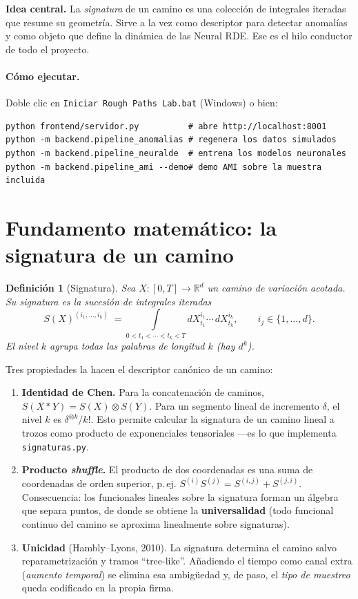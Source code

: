 \documentclass[11pt,a4paper]{article}
\newtheorem{definicion}{Definición}
\begin{document}
\noindent\textbf{Idea central.} La \emph{signatura} de un camino es una
colección de integrales iteradas que resume su geometría. Sirve a la vez como
descriptor para detectar anomalías y como objeto que define la dinámica de las
Neural RDE. Ese es el hilo conductor de todo el proyecto.

\paragraph{Cómo ejecutar.} Doble clic en \texttt{Iniciar Rough Paths Lab.bat}
(Windows) o bien:
\begin{lstlisting}[numbers=none]
python frontend/servidor.py          # abre http://localhost:8001
python -m backend.pipeline_anomalias # regenera los datos simulados
python -m backend.pipeline_neuralde  # entrena los modelos neuronales
python -m backend.pipeline_ami --demo# demo AMI sobre la muestra incluida
\end{lstlisting}

\section{Fundamento matemático: la signatura de un camino}

\begin{definicion}[Signatura]
Sea $X:[0,T]\to\mathbb{R}^d$ un camino de variación acotada. Su
\emph{signatura} es la sucesión de integrales iteradas
\[
S(X)^{(i_1,\dots,i_k)} \;=\!\!\int\limits_{0<t_1<\cdots<t_k<T}\!\!
   dX^{i_1}_{t_1}\cdots\, dX^{i_k}_{t_k},
\qquad i_j\in\{1,\dots,d\}.
\]
El nivel $k$ agrupa todas las palabras de longitud $k$ (hay $d^k$).
\end{definicion}

Tres propiedades la hacen el descriptor canónico de un camino:

\begin{enumerate}[leftmargin=1.6em]
\item \textbf{Identidad de Chen.} Para la concatenación de caminos,
  $S(X * Y) = S(X)\otimes S(Y)$. Para un segmento lineal de incremento
  $\delta$, el nivel $k$ es $\delta^{\otimes k}/k!$. Esto permite calcular la
  signatura de un camino lineal a trozos como producto de exponenciales
  tensoriales ---es lo que implementa \texttt{signaturas.py}.
\item \textbf{Producto \emph{shuffle}.} El producto de dos coordenadas es una
  suma de coordenadas de orden superior, p.\,ej.
  $S^{(i)}S^{(j)} = S^{(i,j)} + S^{(j,i)}$. Consecuencia: los funcionales
  lineales sobre la signatura forman un álgebra que separa puntos, de donde se
  obtiene la \textbf{universalidad} (todo funcional continuo del camino se
  aproxima linealmente sobre signaturas).
\item \textbf{Unicidad} (Hambly--Lyons, 2010). La signatura determina el camino
  salvo reparametrización y tramos ``tree-like''. Añadiendo el tiempo como
  canal extra (\emph{aumento temporal}) se elimina esa ambigüedad y, de paso,
  el \emph{tipo de muestreo} queda codificado en la propia firma.
\end{enumerate}
\end{document}
